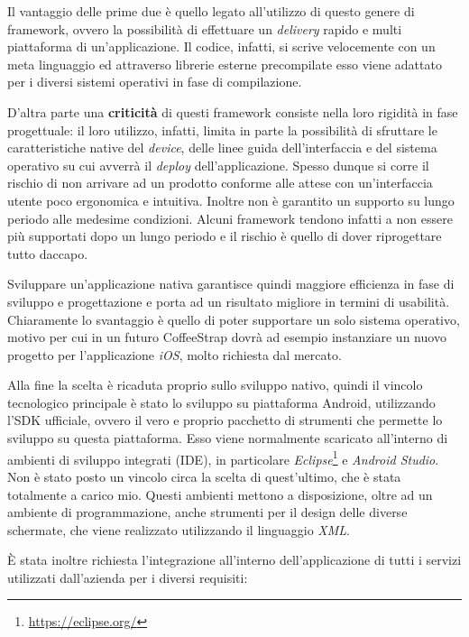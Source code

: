 Il vantaggio delle prime due è quello legato all'utilizzo di questo genere di framework, ovvero la possibilità di effettuare un \textit{delivery} rapido e multi piattaforma di un'applicazione. Il codice, infatti, si scrive velocemente con un meta linguaggio ed attraverso librerie esterne precompilate esso viene adattato per i diversi sistemi operativi in fase di compilazione. 

D'altra parte una \textbf{criticità} di questi framework consiste nella loro rigidità in fase progettuale: il loro utilizzo, infatti, limita in parte la possibilità di sfruttare le caratteristiche native del \textit{device}, delle linee guida dell'interfaccia e del sistema operativo su cui avverrà il \textit{deploy} dell'applicazione. Spesso dunque si corre il rischio di non arrivare ad un prodotto conforme alle attese con un'interfaccia utente poco ergonomica e intuitiva. Inoltre non è garantito un supporto su lungo periodo alle medesime condizioni. Alcuni framework tendono infatti a non essere più supportati dopo un lungo periodo e il rischio è quello di dover riprogettare tutto daccapo.

Sviluppare un'applicazione nativa garantisce quindi maggiore efficienza in fase di sviluppo e progettazione e porta ad un risultato migliore in termini di usabilità. Chiaramente lo svantaggio è quello di poter supportare un solo sistema operativo, motivo per cui in un futuro CoffeeStrap dovrà ad esempio instanziare un nuovo progetto per l'applicazione \textit{iOS}, molto richiesta dal mercato.

Alla fine la scelta è ricaduta proprio sullo sviluppo nativo, quindi il vincolo tecnologico principale è stato lo sviluppo su piattaforma Android, utilizzando l'SDK ufficiale, ovvero il vero e proprio pacchetto di strumenti che permette lo sviluppo su questa piattaforma. Esso viene normalmente scaricato all'interno di ambienti di sviluppo integrati (IDE), in particolare \textit{Eclipse}\footnote{\url{https://eclipse.org/}} e \textit{Android Studio}. Non è stato posto un vincolo circa la scelta di quest'ultimo, che è stata totalmente a carico mio. Questi ambienti mettono a disposizione, oltre ad un ambiente di programmazione, anche strumenti per il design delle diverse schermate, che viene realizzato utilizzando il linguaggio \textit{XML}. 

È stata inoltre richiesta l'integrazione all'interno dell'applicazione di tutti i servizi utilizzati dall'azienda per i diversi requisiti:

